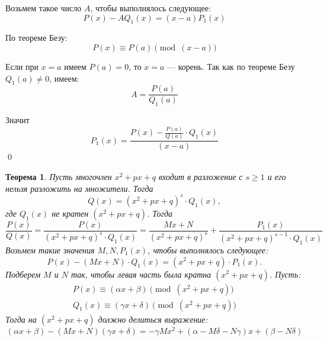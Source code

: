 \documentclass[a4paper,12pt,oneside]{extbook}
\theoremstyle{numbered}
\theoremstyle{unnumbered}
\theoremstyle{named}
\newtheorem{theorem}{Теорема}[section]
\theoremstyle{unnumbered}
\theoremstyle{named}
\theoremstyle{named}
\theoremstyle{named}
\renewenvironment{proof}{{\noindent\textbf{Доказательство.}}}{\qed}
\begin{document}
\begin{proof}
    Возьмем такое число \(A\), чтобы выполнялось следующее:
    \[
        P(x) - A Q_1(x) = (x - a) P_1(x)
    \]

    По теореме Безу:
    \begin{equation}
        P(x) \equiv P(a) \pmod{(x - a)}
    \end{equation}

    Если при \(x = a\) имеем \(P(a) = 0\), то \(x = a\) — корень. Так как по теореме Безу \(Q_1(a) \neq 0\), имеем:
    \begin{equation}
        A = \frac{P(a)}{Q_1(a)}
    \end{equation}

    Значит
    \[
        P_1(x) = \frac{P(x) - \frac{P(a)}{Q(a)} \cdot Q_1(x)}{(x - a)}
    \]
\end{proof}

\begin{theorem}
    Пусть многочлен \(x^2 + px + q\) входит в разложение с \(s \geq 1\) и его нельзя разложить на множители. Тогда
    \begin{equation}
        Q(x) = (x^2 + px + q)^s \cdot Q_1(x),
    \end{equation}
    где \(Q_1(x)\) не кратен \((x^2 + px + q)\). Тогда
    \begin{equation}
        \frac{P(x)}{Q(x)} = \frac{P(x)}{(x^2 + px + q)^s \cdot Q_1(x)} = \frac{Mx + N}{(x^2 + px + q)^s} + \frac{P_1(x)}{(x^2 + px + q)^{s - 1} \cdot Q_1(x)}
    \end{equation}
    Возьмем такие значения \(M, N, P_1(x)\), чтобы выполнялось следующее:
    \begin{equation}
        P(x) - (Mx + N) \cdot Q_1(x) = (x^2 + px + q) \cdot P_1(x).
    \end{equation}
    Подберем \(M\) и \(N\) так, чтобы левая часть была кратна \((x^2 + px + q)\). Пусть:
    \begin{equation}
        \begin{gathered}
            P(x) \equiv (\alpha x + \beta) \pmod{(x^2 + px + q)} \\
            Q_1(x) \equiv (\gamma x + \delta) \pmod{(x^2 + px + q)}
        \end{gathered}
    \end{equation}
    Тогда на \((x^2 + px + q)\) должно делиться выражение:
    \begin{equation}
        (\alpha x + \beta) - (Mx + N)(\gamma x + \delta) = - \gamma Mx^2 + (\alpha - M\delta - N\gamma)x + (\beta - N\delta)
    \end{equation}
\end{theorem}
\end{document}
